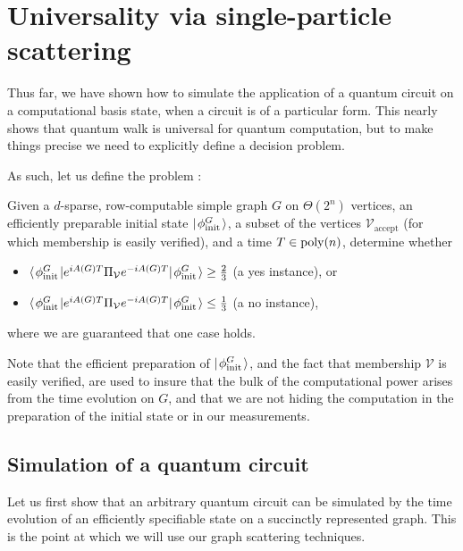 \documentclass[../thesis-main/thesis-main]{subfiles}
\begin{document}


\section{Universality via single-particle scattering}

Thus far, we have shown how to simulate the application of a quantum circuit on a computational basis state, when a circuit is of a particular form.  This nearly shows that quantum walk is universal for quantum computation, but to make things precise we need to explicitly define a decision problem.

As such, let us define the problem \QWE:
\begin{problem}[\QWE] Given a $d$-sparse, row-computable simple graph $G$ on $\Theta(2^n)$ vertices, an efficiently preparable initial state $|\mspace{2mu} \phi_{\text{init}}^G \mspace{2mu} \rangle$, a subset of the vertices $\mathcal{V}_{\text{accept}}$ (for which membership is easily verified), and a time $T \in \operatorname{poly}(n)$, determine whether
\begin{itemize}
   \item $\langle\mspace{2mu} \phi_{\text{init}}^G \mspace{2mu} | e^{i A(G) T} \Pi_{\mathcal{V}} e^{-i A(G)T} |\mspace{2mu} \phi_{\text{init}}^G \mspace{2mu} \rangle \geq \frac{2}{3}$ (a yes instance), or
   \item $\langle\mspace{2mu} \phi_{\text{init}}^G \mspace{2mu} | e^{i A(G) T} \Pi_{\mathcal{V}} e^{-i A(G)T} |\mspace{2mu} \phi_{\text{init}}^G \mspace{2mu} \rangle \leq \frac{1}{3}$ (a no instance),
\end{itemize}
where we are guaranteed that one case holds.
\end{problem}

Note that the efficient preparation of $|\mspace{2mu} \phi_{\text{init}}^G \mspace{2mu} \rangle$, and the fact that membership $\mathcal{V}$ is easily verified, are used to insure that the bulk of the computational power arises from the time evolution on $G$, and that we are not hiding the computation in the preparation of the initial state or in our measurements.

\subsection{Simulation of a quantum circuit}

Let us first show that an arbitrary quantum circuit can be simulated by the time evolution of an efficiently specifiable state on a succinctly represented graph.  This is the point at which we will use our graph scattering techniques.  
\end{document}
